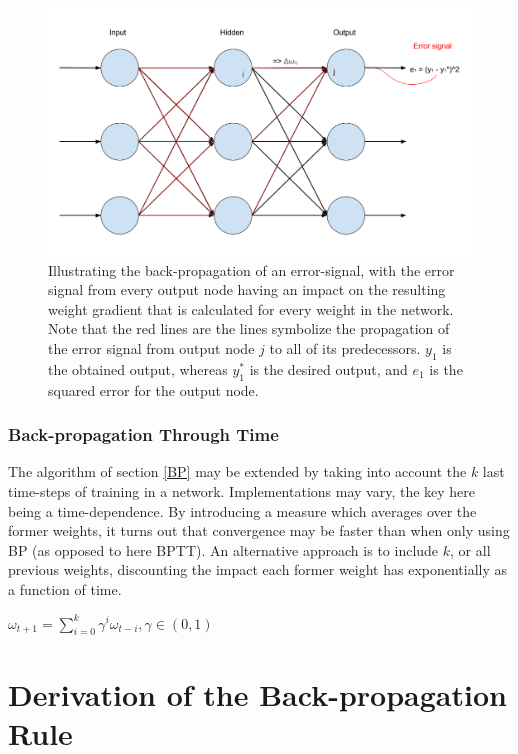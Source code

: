 \begin{figure}
\centering
\includegraphics[width=13cm]{fig/BP_error}
\caption{Illustrating the back-propagation of an error-signal, with the error signal from every output node having an impact on the resulting weight gradient that is calculated for every weight in the network. Note that the red lines are the lines symbolize the propagation of the error signal from output node $j$ to all of its predecessors. $y_1$ is the obtained output, whereas $y_1^*$ is the desired output, and $e_1$ is the squared error for the output node.}
\label{fig:BP_error}
\end{figure}

\subsubsection{Back-propagation Through Time}

The algorithm of section \ref{BP} may be extended by taking into account the $k$ last time-steps of training in a network. Implementations may vary, the key here being a time-dependence. By introducing a measure which averages over the former weights, it turns out that convergence may be faster than when only using BP (as opposed to here BPTT). An alternative approach is to include $k$, or all previous weights, discounting the impact each former weight has exponentially as a function of time.

\begin{center}
\begin{math}
    \omega_{t+1} = \sum_{i=0}^{k}\gamma^i \omega_{t-i},
    \gamma \in (0, 1)
\end{math}
\end{center}

\section{Derivation of the Back-propagation Rule}\label{bptt-derivation}

